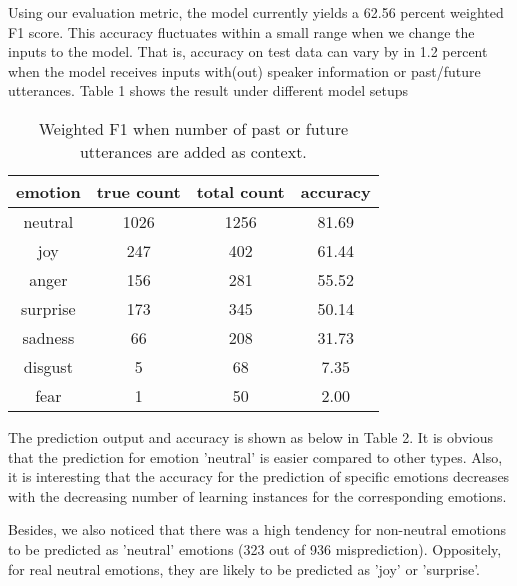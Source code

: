 \documentclass[11pt]{article}
\begin{document}
Using our evaluation metric, the model currently yields a 62.56 percent weighted F1 score. This accuracy fluctuates within a small range when we change the inputs to the model. That is, accuracy on test data can vary by in 1.2 percent when the model receives inputs with(out) speaker information or past/future utterances. Table 1 shows the result under different model setups

\begin{table}[hbt]
  \centering
  \begin{tabular}{c|c|c|c}
    emotion & true count & total count & accuracy \\
    \hline
    neutral & 1026 & 1256 & 81.69 \\
    \hline
    joy & 247 & 402 & 61.44 \\
    \hline
    anger & 156 & 281 & 55.52 \\
    \hline
    surprise & 173 & 345 & 50.14 \\
    \hline
    sadness & 66 & 208 & 31.73 \\
    \hline
    disgust & 5 & 68 & 7.35 \\
    \hline
    fear & 1 & 50 & 2.00 \\
  \end{tabular}
  \caption{Weighted F1 when number of past or future utterances are added as context.}
\end{table}

The prediction output and accuracy is shown as below in Table 2. It is obvious that the prediction for emotion 'neutral' is easier compared to other types. Also, it is interesting that the accuracy for the prediction of specific emotions decreases with the decreasing number of learning instances for the corresponding emotions. 

Besides, we also noticed that there was a high tendency for non-neutral emotions to be predicted as 'neutral' emotions (323 out of 936 misprediction). Oppositely, for real neutral emotions, they are likely to be predicted as 'joy' or 'surprise'.
\end{document}
